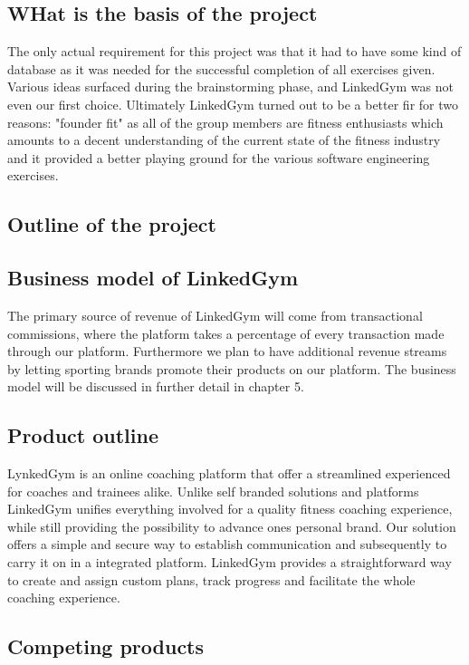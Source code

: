 \subsection{WHat is the basis of the project}

The only actual requirement for this project was that it had to have some kind of database as it was needed for the successful completion of all exercises given.
Various ideas surfaced during the brainstorming phase, and LinkedGym was not even our first choice. Ultimately LinkedGym turned out to be a better fir for two reasons: "founder fit" as all of the group members are fitness enthusiasts which amounts to a decent understanding of the current state of the fitness industry and it provided a better playing ground for the various software engineering exercises.

\subsection{Outline of the project}

\subsection{Business model of LinkedGym}

The primary source of revenue of LinkedGym will come from transactional commissions, where the platform takes a percentage of every transaction made through our platform. Furthermore we plan to have additional revenue streams by letting sporting brands promote their products on our platform.
The business model will be discussed in further detail in chapter 5.

\subsection{Product outline}

LynkedGym is an online coaching platform that offer a streamlined experienced for coaches and trainees alike. Unlike self branded solutions and platforms LinkedGym unifies everything involved for a quality fitness coaching experience, while still providing the possibility to advance ones personal brand. Our solution offers a simple and secure way to establish communication and subsequently to carry it on in a integrated platform. LinkedGym provides a straightforward way to create and assign custom plans, track progress and facilitate the whole coaching experience.

\subsection{Competing products}

